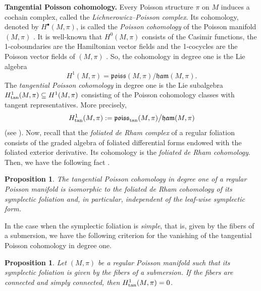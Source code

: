 \documentclass[10pt,a4paper]{amsart}
\numberwithin{equation}{section}
\newtheorem{Proposition}[Theorem]{Proposition}
 { \theoremstyle{definition}
\newtheorem{Definition}[Theorem]{Definition}
\newtheorem{Note}[Theorem]{Note}
\newtheorem{Example}[Theorem]{Example}
\newtheorem{Remark}[Theorem]{Remark} }
\begin{document}
{\bf Tangential Poisson cohomology.} Every Poisson structure $\pi$ on $M$ induces a cochain complex, called the \emph{Lichnerowicz--Poisson complex}. Its cohomology, denoted by $H^{\bullet}(M,\pi)$, is called the \emph{Poisson cohomology} of the Poisson manifold $(M,\pi)$ \cite{Lichnerowicz}. It is well-known that $H^{0}(M,\pi)$ consists of the Casimir functions, the 1-coboundaries are the Hamiltonian vector fields and the 1-cocycles are the Poisson vector fields of $(M,\pi)$ \cite{DZ,Lichnerowicz,Va-94,VK-88,VK-90}. So, the cohomology in degree one is the Lie algebra
 \begin{equation*}
 H^{1}(M,\pi) = {\mathfrak{poiss}(M,\pi)} \big/ {\mathfrak{ham}(M,\pi)}.
 \end{equation*}
The \emph{tangential Poisson cohomology} in degree one is the Lie subalgebra $H^{1}_{{\rm tan}}(M,\pi) \subseteq H^{1}(M,\pi)$ consisting of the Poisson cohomology classes with tangent representatives. More precisely,
 \begin{equation*}
 H^{1}_{{\rm tan}}(M,\pi) := {\mathfrak{poiss}_{{\rm tan}}(M,\pi)} \big/ {\mathfrak{ham}(M,\pi)}
 \end{equation*}
(see \cite[Definition~2]{AG}). Now, recall that the \emph{foliated de Rham complex} of a regular foliation consists of the graded algebra of foliated differential forms endowed with the foliated exterior derivative. Its cohomology is the \emph{foliated de Rham cohomology}.
Then, we have the following fact \cite[Chapter~5]{Va-94}.

\begin{Proposition}\label{prop:PoissTan}
The tangential Poisson cohomology in degree one of a regular Poisson manifold is isomorphic to the foliated de Rham cohomology of its symplectic foliation and, in particular, independent of the leaf-wise symplectic form.
\end{Proposition}

In the case when the symplectic foliation is \emph{simple}, that is, given by the fibers of a submersion, we have the following criterion for the vanishing of the tangential Poisson cohomology in degree one.

\begin{Proposition}\label{prop:H1triv}
Let $(M,\pi)$ be a regular Poisson manifold such that its symplectic foliation is given by the fibers of a submersion. If the fibers are connected and simply connected, then $H^{1}_{{\rm tan}}(M,\pi)=0$.
\end{Proposition}
\end{document}
